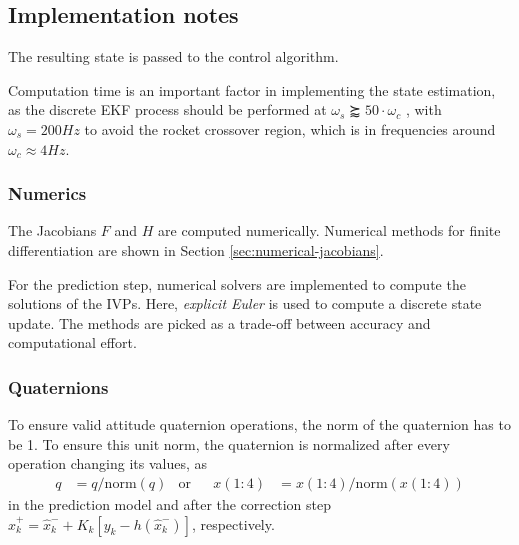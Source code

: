 \subsection{Implementation notes}
\label{sec:estimator-implementation}

The resulting state is passed to the control algorithm.

Computation time is an important factor in implementing the state estimation, as the discrete EKF process should be performed at $\omega_s \succapprox 50 \cdot \omega_c$ \cite{werner2021}, with $\omega_s = 200Hz$ to avoid the rocket crossover region, which is in frequencies around $ \omega_c \approx 4Hz$.

\subsubsection{Numerics}
The Jacobians $F$ and $H$ are computed numerically. 
Numerical methods for finite differentiation are shown in Section \ref{sec:numerical-jacobians}.

For the prediction step, numerical solvers are implemented to compute the solutions of the IVPs.
Here, \textit{explicit Euler} is used to compute a discrete state update.
The methods are picked as a trade-off between accuracy and computational effort.

\subsubsection{Quaternions}
To ensure valid attitude quaternion operations, the norm of the quaternion has to be 1.
To ensure this unit norm, the quaternion is normalized after every operation changing its values, as
\begin{align}
    q &= q/\mathrm{norm}(q) & \text{or} & & x(1:4) &= x(1:4)/\mathrm{norm}(x(1:4))
\end{align}
in the prediction model and after the correction step $\hat x_{k}^{+} = \hat x_{k}^{-} + K_{k} \left[ y_{k} - h(\hat x_{k}^{-}) \right]$, respectively.

